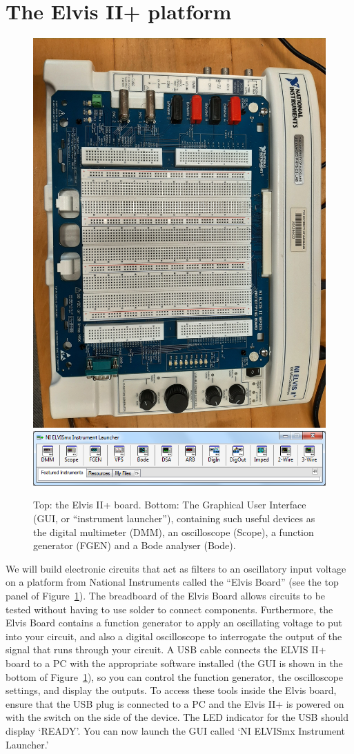 \documentclass{article}
\begin{document}
\section*{The Elvis II+ platform}
\begin{figure}
  \centering
  \includegraphics[width=0.5\columnwidth]{images/elvisIIplus.jpg}\\
  \includegraphics[width=0.5\columnwidth]{launcher.png}
  \caption{Top: the Elvis II+ board. Bottom: The
    Graphical User Interface (GUI, or ``instrument launcher''), containing
    such useful devices as the digital multimeter (DMM), an
    oscilloscope (Scope), a function generator (FGEN) and a Bode
    analyser (Bode).}
  \label{fig:elvisii}
\end{figure}
We will build electronic circuits that act as filters to an
oscillatory input voltage on a platform from National Instruments
called the ``Elvis Board'' (see the top panel of
Figure~\ref{fig:elvisii}). The breadboard of the Elvis Board allows
circuits to be tested without having to use solder to connect
components. Furthermore, the Elvis Board contains a function generator
to apply an oscillating voltage to put into your circuit, and also a
digital oscilloscope to interrogate the output of the signal that runs
through your circuit. A USB cable connects the ELVIS II+ board to a PC
with the appropriate software installed (the GUI is shown in the
bottom of Figure~\ref{fig:elvisii}), so you can control the function
generator, the oscilloscope settings, and display the outputs.  To
access these tools inside the Elvis board, ensure that the USB plug is
connected to a PC and the Elvis II+ is powered on with the switch on
the side of the device. The LED indicator for the USB should display
`READY'. You can now launch the GUI called `NI ELVISmx Instrument
Launcher.'
\end{document}
